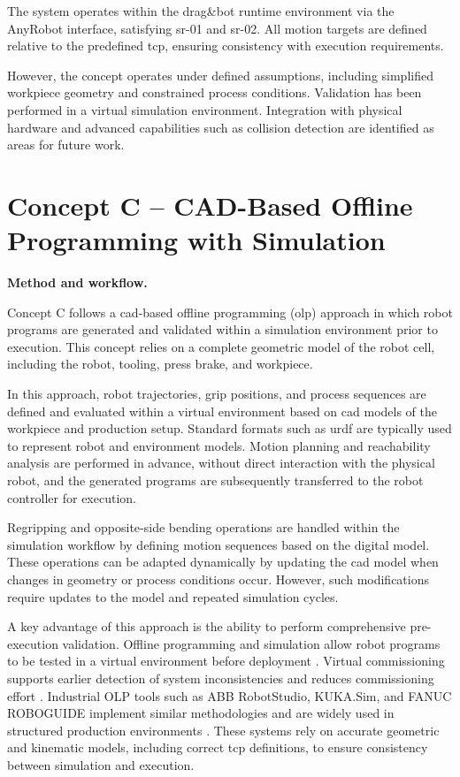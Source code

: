 The system operates within the drag\&bot runtime environment via the AnyRobot interface, satisfying \acs{sr}-01 and \acs{sr}-02. All motion targets are defined relative to the predefined \ac{tcp}, ensuring consistency with execution requirements.

However, the concept operates under defined assumptions, including simplified workpiece geometry and constrained process conditions. Validation has been performed in a virtual simulation environment. Integration with physical hardware and advanced capabilities such as collision detection are identified as areas for future work.
\section{Concept C -- CAD-Based Offline Programming with Simulation}
\label{sec:concept-c-cad-olp-simulation}

\label{sec:concept-c-methodological-framework}
\noindent\textbf{Method and workflow.}

Concept C follows a \acs{cad}-based offline programming (\acs{olp}) approach in which robot programs are generated and validated within a simulation environment prior to execution. This concept relies on a complete geometric model of the robot cell, including the robot, tooling, press brake, and workpiece.

In this approach, robot trajectories, grip positions, and process sequences are defined and evaluated within a virtual environment based on \acs{cad} models of the workpiece and production setup. Standard formats such as \ac{urdf} are typically used to represent robot and environment models. Motion planning and reachability analysis are performed in advance, without direct interaction with the physical robot, and the generated programs are subsequently transferred to the robot controller for execution.

Regripping and opposite-side bending operations are handled within the simulation workflow by defining motion sequences based on the digital model. These operations can be adapted dynamically by updating the \acs{cad} model when changes in geometry or process conditions occur. However, such modifications require updates to the model and repeated simulation cycles.

A key advantage of this approach is the ability to perform comprehensive pre-execution validation. Offline programming and simulation allow robot programs to be tested in a virtual environment before deployment \cite{Pan2012Survey}. Virtual commissioning supports earlier detection of system inconsistencies and reduces commissioning effort \cite{Lechler2019VirtualCommissioning}. Industrial OLP tools such as ABB RobotStudio, KUKA.Sim, and FANUC ROBOGUIDE implement similar methodologies and are widely used in structured production environments \cite{Pan2012Survey}. These systems rely on accurate geometric and kinematic models, including correct \ac{tcp} definitions, to ensure consistency between simulation and execution.

